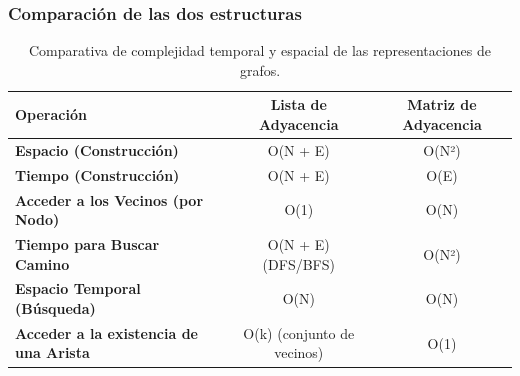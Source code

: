\documentclass[10pt,a4paper]{article}
\begin{document}
\subsubsection*{Comparación de las dos estructuras}
\begin{table}[h!]
    \centering
    \begin{tabular}{|l|c|c|}
    \hline
    \textbf{Operación}                        & \textbf{Lista de Adyacencia}          & \textbf{Matriz de Adyacencia}      \\ \hline
    \textbf{Espacio (Construcción)}           & O(N + E)                             & O(N²)                              \\ \hline
    \textbf{Tiempo (Construcción)}            & O(N + E)                             & O(E)                               \\ \hline
    \textbf{Acceder a los Vecinos (por Nodo)} & O(1)                                 & O(N)                               \\ \hline
    \textbf{Tiempo para Buscar Camino}        & O(N + E) (DFS/BFS)                   & O(N²)                              \\ \hline
    \textbf{Espacio Temporal (Búsqueda)}      & O(N)                                 & O(N)                               \\ \hline
    \textbf{Acceder a la existencia de una Arista} & O(k) (conjunto de vecinos)    & O(1)                               \\ \hline
    \end{tabular}
    \caption{Comparativa de complejidad temporal y espacial de las representaciones de grafos.}
\end{table}
\end{document}
